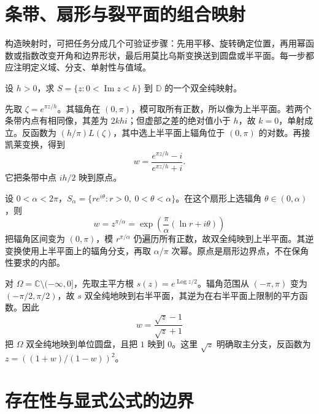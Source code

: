 \section{条带、扇形与裂平面的组合映射}

构造映射时，可把任务分成几个可验证步骤：先用平移、旋转确定位置，再用幂函数或指数改变开角和边界形状，最后用莫比乌斯变换送到圆盘或半平面。每一步都应注明定义域、分支、单射性与值域。

\begin{example}[水平条带映到单位圆盘]
设 $h>0$，求 $S=\{z:0<\operatorname{Im}z<h\}$ 到 $\mathbb D$ 的一个双全纯映射。
\end{example}
\begin{solve}
先取 $\zeta=e^{\pi z/h}$。其辐角在 $(0,\pi)$，模可取所有正数，所以像为上半平面。若两个条带内点有相同像，其差为 $2khi$；但虚部之差的绝对值小于 $h$，故 $k=0$，单射成立。反函数为 $(h/\pi)L(\zeta)$，其中选上半平面上辐角位于 $(0,\pi)$ 的对数。再接凯莱变换，得到
\[
 w=\frac{e^{\pi z/h}-i}{e^{\pi z/h}+i}.
\]
它把条带中点 $ih/2$ 映到原点。
\end{solve}

\begin{example}[扇形映到上半平面]
设 $0<\alpha<2\pi$，$S_\alpha=\{re^{i\theta}:r>0,\ 0<\theta<\alpha\}$。在这个扇形上选辐角 $\theta\in(0,\alpha)$，则
\[
 w=z^{\pi/\alpha}=\exp\left(\frac\pi\alpha(\ln r+i\theta)\right)
\]
把辐角区间变为 $(0,\pi)$，模 $r^{\pi/\alpha}$ 仍遍历所有正数，故双全纯映到上半平面。其逆变换使用上半平面上的辐角分支，再取 $\alpha/\pi$ 次幂。原点是扇形边界点，不在保角性要求的内部。
\end{example}

\begin{example}[裂平面映到圆盘]
对 $\Omega=\mathbb C\setminus(-\infty,0]$，先取主平方根 $s(z)=e^{\operatorname{Log}z/2}$。辐角范围从 $(-\pi,\pi)$ 变为 $(-\pi/2,\pi/2)$，故 $s$ 双全纯地映到右半平面，其逆为在右半平面上限制的平方函数。因此
\[
 w=\frac{\sqrt z-1}{\sqrt z+1}
\]
把 $\Omega$ 双全纯地映到单位圆盘，且把 $1$ 映到 $0$。这里 $\sqrt z$ 明确取主分支，反函数为 $z=((1+w)/(1-w))^2$。
\end{example}

\section{存在性与显式公式的边界}

